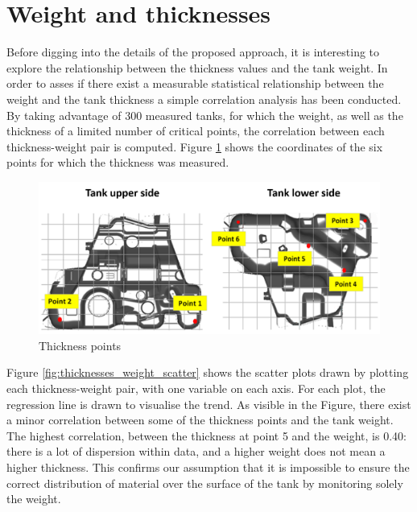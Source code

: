\section{Weight and thicknesses}

Before digging into the details of the proposed approach, it is interesting to explore the relationship between the thickness values and the tank weight. In order to asses if there exist a measurable statistical relationship between the weight and the tank thickness a simple correlation analysis has been conducted. By taking advantage of 300 measured tanks, for which the weight, as well as the thickness of a limited number of critical points, the correlation between each thickness-weight pair is computed. Figure \ref{fig:thickness_points} shows the coordinates of the six points for which the thickness was measured. 
%
\begin{figure}
\centering
\includegraphics[scale=0.55]{images/chapter_4/Thickness_points.png}
\caption{Thickness points}
\label{fig:thickness_points}
\end{figure}
%
Figure \ref{fig:thicknesses_weight_scatter} shows the scatter plots drawn by plotting each thickness-weight pair, with one variable on each axis. For each plot, the regression line is drawn to visualise the trend. As visible in the Figure, there exist a minor correlation between some of the thickness points and the tank weight. The highest correlation, between the thickness at point 5 and the weight, is 0.40: there is a lot of dispersion within data, and a higher weight does not mean a higher thickness. This confirms our assumption that it is impossible to ensure the correct distribution of material over the surface of the tank by monitoring solely the weight. 
%
